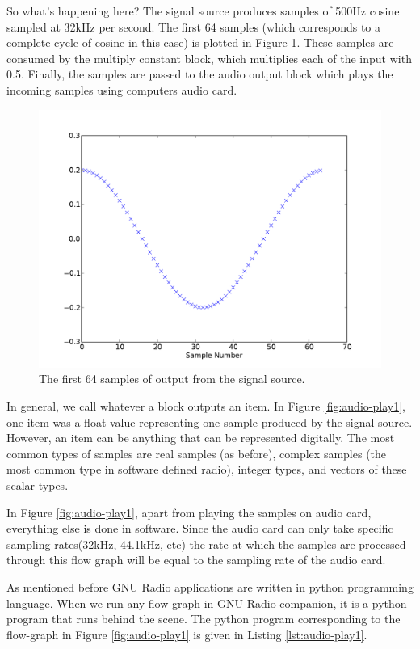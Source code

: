 \documentclass[a4paper,10pt]{article}
\begin{document}
So what's happening here?
The signal source produces samples of 500Hz cosine sampled at 32kHz per second.
The first 64 samples (which corresponds to a complete cycle of cosine in this case)
is plotted in Figure \ref{fig:signal-source-out}.
These samples are consumed by the multiply constant block,
which multiplies each of the input with 0.5.
Finally, the samples are passed to the audio output block which plays the incoming samples using computers audio card.
\begin{figure}
 \centering
 \includegraphics[scale=0.4]{figures/signal-source-out}
 \caption{The first 64 samples of output from the signal source. \label{fig:signal-source-out}}
\end{figure}

In general, we call whatever a block outputs an item. 
In Figure \ref{fig:audio-play1}, one item was a float value representing one sample produced by the signal source. 
However, an item can be anything that can be represented digitally. 
The most common types of samples are real samples (as before), complex samples (the most common type in software defined radio), integer types, and vectors of these scalar types.

In Figure \ref{fig:audio-play1}, apart from playing the samples on audio card, everything else is done in software.
Since the audio card can only take specific sampling rates(32kHz, 44.1kHz, etc)
the rate at which the samples are processed through this flow graph will be equal to the sampling rate of the audio card.

As mentioned before GNU Radio applications are written in python programming language. When we run any flow-graph
in GNU Radio companion, it is a python program that runs behind the scene. The python program corresponding to 
the flow-graph in Figure \ref{fig:audio-play1} is given in Listing \ref{lst:audio-play1}.
\\
\end{document}
